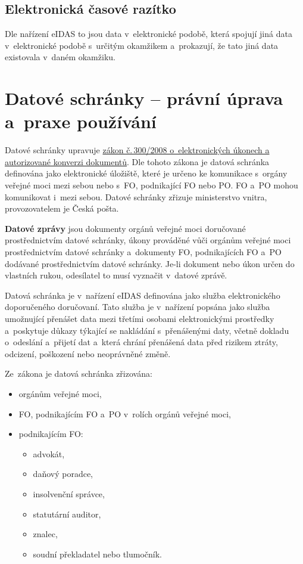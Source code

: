 \subsection{Elektronická časové razítko} Dle nařízení eIDAS to jsou data v~elektronické podobě, která spojují jiná data v~elektronické podobě s~určitým okamžikem a~prokazují, že tato jiná data existovala v~daném okamžiku.







\clearpage
\section{Datové schránky -- právní úprava a~praxe používání}

Datové schránky upravuje \href{https://www.zakonyprolidi.cz/cs/2008-300}{zákon č.\,300/2008 o~elektronických úkonech a autorizované konverzi dokumentů}. Dle tohoto zákona je datová schránka definována jako elektronické úložiště, které je určeno ke komunikace s~orgány veřejné moci mezi sebou nebo s~FO, podnikající FO nebo PO. FO a~PO mohou komunikovat i~mezi sebou. Datové schránky zřizuje ministerstvo vnitra, provozovatelem je Česká pošta.

\textbf{Datové zprávy} jsou dokumenty orgánů veřejné moci doručované prostřednictvím datové schránky, úkony prováděné vůči orgánům veřejné moci prostřednictvím datové schránky a~dokumenty FO, podnikajících FO a~PO dodávané prostřednictvím datové schránky. Je-li dokument nebo úkon určen do vlastních rukou, odesílatel to musí vyznačit v~datové zprávě. 

Datová schránka je v~nařízení eIDAS definována jako služba elektronického doporučeného doručovaní. Tato služba je v~nařízení popsána jako služba umožnující přenášet data mezi třetími osobami elektronickými prostředky a~poskytuje důkazy týkající se nakládání s~přenášenými daty, včetně dokladu o~odeslání a~přijetí dat a~která chrání přenášená data před rizikem ztráty, odcizení, poškození nebo neoprávněné změně.

Ze~zákona je datová schránka zřizována:

\begin{itemize}
    \item orgánům veřejné moci,
    \item FO, podnikajícím FO a~PO v~rolích orgánů veřejné moci,
    \item podnikajícím FO:
    \begin{itemize}
        \item advokát,
        \item daňový poradce,
        \item insolvenční správce,
        \item statutární auditor,
        \item znalec,
        \item soudní překladatel nebo tlumočník.
    \end{itemize}
\end{itemize}

